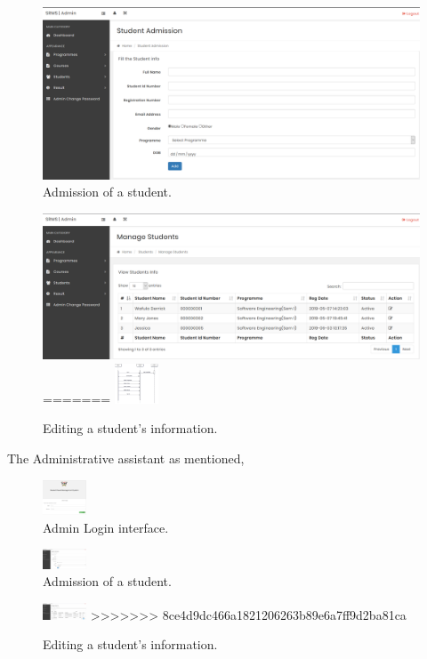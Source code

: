 \begin{enumerate}
\begin{figure}[H]
\end{figure}
\begin{figure}[H]
\caption{Admission of a student.}
\includegraphics[scale=0.4]{images/add_student.png}
\end{figure}
\begin{figure}[H]
\caption{Editing a student's information.}
\includegraphics[scale=0.4]{images/manage_students.png}
=======
\includegraphics[width=1.3cm]{images/SequenceAdmin.png}
\end{figure}
The Administrative assistant as mentioned, 
\begin{figure}[H]
\caption{Admin Login interface.}
\includegraphics[width=1.3cm]{images/admin_login.png}
\end{figure}
\begin{figure}[H]
\caption{Admission of a student.}
\includegraphics[width=1.3cm]{images/add_student.png}
\end{figure}
\begin{figure}[H]
\caption{Editing a student's information.}
\includegraphics[width=1.3cm]{images/manage_students.png}
>>>>>>> 8ce4d9dc466a1821206263b89e6a7ff9d2ba81ca
\end{figure}


\end{enumerate}
